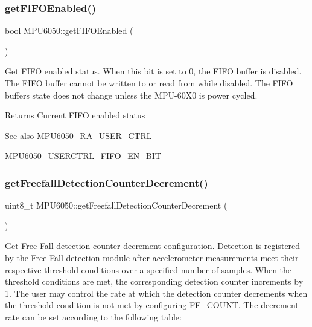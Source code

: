 \subsubsection{\texorpdfstring{getFIFOEnabled()}{getFIFOEnabled()}}
{\footnotesize\ttfamily bool M\+P\+U6050\+::get\+F\+I\+F\+O\+Enabled (\begin{DoxyParamCaption}{ }\end{DoxyParamCaption})}

Get F\+I\+FO enabled status. When this bit is set to 0, the F\+I\+FO buffer is disabled. The F\+I\+FO buffer cannot be written to or read from while disabled. The F\+I\+FO buffer\textquotesingle{}s state does not change unless the M\+P\+U-\/60\+X0 is power cycled. \begin{DoxyReturn}{Returns}
Current F\+I\+FO enabled status 
\end{DoxyReturn}
\begin{DoxySeeAlso}{See also}
M\+P\+U6050\+\_\+\+R\+A\+\_\+\+U\+S\+E\+R\+\_\+\+C\+T\+RL 

M\+P\+U6050\+\_\+\+U\+S\+E\+R\+C\+T\+R\+L\+\_\+\+F\+I\+F\+O\+\_\+\+E\+N\+\_\+\+B\+IT 
\end{DoxySeeAlso}
\mbox{\label{class_m_p_u6050_af6d6fa9869636989a8b29c4827ad7de8}} 
\subsubsection{\texorpdfstring{getFreefallDetectionCounterDecrement()}{getFreefallDetectionCounterDecrement()}}
{\footnotesize\ttfamily uint8\+\_\+t M\+P\+U6050\+::get\+Freefall\+Detection\+Counter\+Decrement (\begin{DoxyParamCaption}{ }\end{DoxyParamCaption})}

Get Free Fall detection counter decrement configuration. Detection is registered by the Free Fall detection module after accelerometer measurements meet their respective threshold conditions over a specified number of samples. When the threshold conditions are met, the corresponding detection counter increments by 1. The user may control the rate at which the detection counter decrements when the threshold condition is not met by configuring F\+F\+\_\+\+C\+O\+U\+NT. The decrement rate can be set according to the following table\+:


